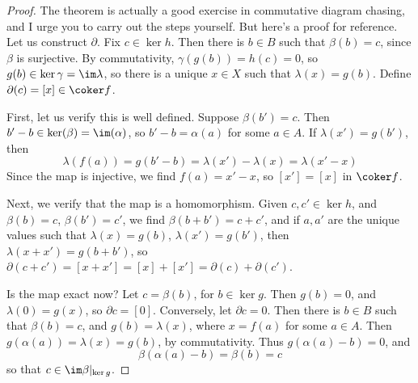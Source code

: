 \begin{proof}
    The theorem is actually a good exercise in commutative diagram chasing, and I urge you to carry out the steps yourself. But here's a proof for reference. Let us construct $\partial$. Fix $c \in \ker h$. Then there is $b \in B$ such that $\beta(b) = c$, since $\beta$ is surjective. By commutativity, $\gamma(g(b)) = h(c) = 0$, so $g(b) \in \ker \gamma = \im \lambda$, so there is a unique $x \in X$ such that $\lambda(x) = g(b)$. Define $\partial(c) = [x] \in \coker f$.

    First, let us verify this is well defined. Suppose $\beta(b') = c$. Then $b' - b \in \ker(\beta) = \im(\alpha)$, so $b' - b = \alpha(a)$ for some $a \in A$. If $\lambda(x') = g(b')$, then
    \[ \lambda(f(a)) = g(b' - b) = \lambda(x') - \lambda(x) = \lambda(x' - x) \]
    Since the map is injective, we find $f(a) = x' - x$, so $[x'] = [x]$ in $\coker f$.

    Next, we verify that the map is a homomorphism. Given $c,c' \in \ker h$, and $\beta(b) = c$, $\beta(b') = c'$, we find $\beta(b + b') = c + c'$, and if $a,a'$ are the unique values such that $\lambda(x) = g(b)$, $\lambda(x') = g(b')$, then $\lambda(x + x') = g(b + b')$, so $\partial(c + c') = [x + x'] = [x] + [x'] = \partial(c) + \partial(c')$.

    Is the map exact now? Let $c = \beta(b)$, for $b \in \ker g$. Then $g(b) = 0$, and $\lambda(0) = g(x)$, so $\partial c = [0]$. Conversely, let $\partial c = 0$. Then there is $b \in B$ such that $\beta(b) = c$, and $g(b) = \lambda(x)$, where $x = f(a)$ for some $a \in A$. Then $g(\alpha(a)) = \lambda(x) = g(b)$, by commutativity. Thus $g(\alpha(a) - b) = 0$, and
    \[ \beta(\alpha(a) - b) = \beta(b) = c \]
    so that $c \in \im \beta|_{\ker g}$.
\end{proof}

